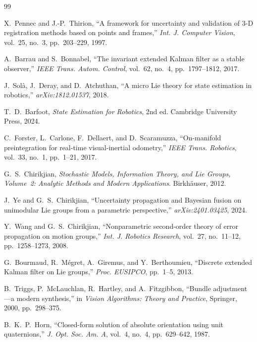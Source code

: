 \documentclass[journal]{IEEEtran}
\begin{document}
\begin{thebibliography}{99}

X.~Pennec and J.-P.~Thirion,
``A framework for uncertainty and validation of 3-D registration 
methods based on points and frames,''
\emph{Int. J. Computer Vision}, vol.~25, no.~3, pp.~203--229, 1997.

A.~Barrau and S.~Bonnabel,
``The invariant extended Kalman filter as a stable observer,''
\emph{IEEE Trans. Autom. Control}, vol.~62, no.~4, pp.~1797--1812, 2017.

J.~Sol\`{a}, J.~Deray, and D.~Atchuthan,
``A micro Lie theory for state estimation in robotics,''
\emph{arXiv:1812.01537}, 2018.

T.~D.~Barfoot,
\emph{State Estimation for Robotics}, 2nd ed.
Cambridge University Press, 2024.

C.~Forster, L.~Carlone, F.~Dellaert, and D.~Scaramuzza,
``On-manifold preintegration for real-time visual-inertial odometry,''
\emph{IEEE Trans. Robotics}, vol.~33, no.~1, pp.~1--21, 2017.

G.~S.~Chirikjian,
\emph{Stochastic Models, Information Theory, and Lie Groups, 
Volume~2: Analytic Methods and Modern Applications}.
Birkh\"{a}user, 2012.

J.~Ye and G.~S.~Chirikjian,
``Uncertainty propagation and Bayesian fusion on unimodular 
Lie groups from a parametric perspective,''
\emph{arXiv:2401.03425}, 2024.

Y.~Wang and G.~S.~Chirikjian,
``Nonparametric second-order theory of error propagation 
on motion groups,''
\emph{Int. J. Robotics Research}, vol.~27, no.~11--12, 
pp.~1258--1273, 2008.

G.~Bourmaud, R.~M\'{e}gret, A.~Giremus, and Y.~Berthoumieu,
``Discrete extended Kalman filter on Lie groups,''
\emph{Proc. EUSIPCO}, pp.~1--5, 2013.

B.~Triggs, P.~McLauchlan, R.~Hartley, and A.~Fitzgibbon,
``Bundle adjustment---a modern synthesis,''
in \emph{Vision Algorithms: Theory and Practice}, 
Springer, 2000, pp.~298--375.

B.~K.~P.~Horn,
``Closed-form solution of absolute orientation using unit 
quaternions,''
\emph{J. Opt. Soc. Am. A}, vol.~4, no.~4, pp.~629--642, 1987.


\end{thebibliography}
\end{document}
